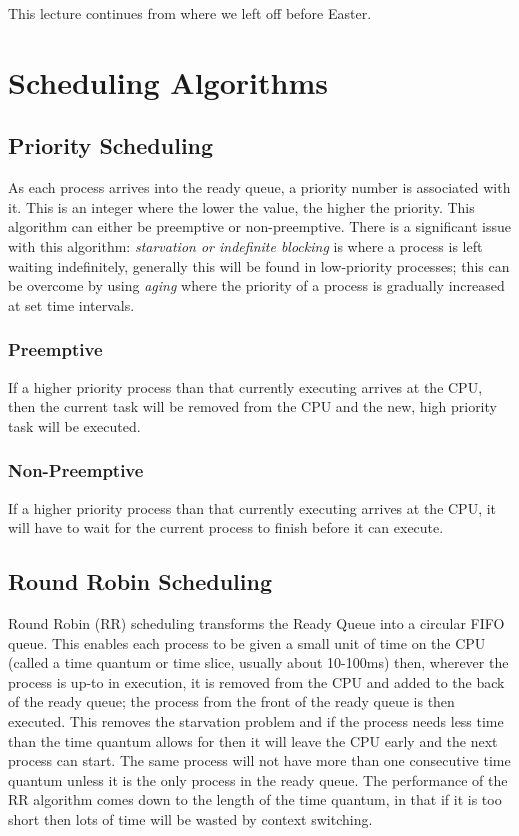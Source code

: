 
This lecture continues from where we left off before Easter.

\section*{Scheduling Algorithms}

\subsection*{Priority Scheduling}
As each process arrives into the ready queue, a priority number is associated with it. This is an integer where the lower the value, the higher the priority. This algorithm can either be preemptive or non-preemptive. There is a significant issue with this algorithm: \textit{starvation or indefinite blocking} is where a process is left waiting indefinitely, generally this will be found in low-priority processes; this can be overcome by using \textit{aging} where the priority of a process is gradually increased at set time intervals. 
\subsubsection*{Preemptive}
If a higher priority process than that currently executing arrives at the CPU, then the current task will be removed from the CPU and the new, high priority task will be executed.
\subsubsection*{Non-Preemptive}
If a higher priority process than that currently executing arrives at the CPU, it will have to wait for the current process to finish before it can execute.

\subsection*{Round Robin Scheduling}
Round Robin (RR) scheduling transforms the Ready Queue into a circular FIFO queue. This enables each process to be given a small unit of time on the CPU (called a time quantum or time slice, usually about 10-100ms) then, wherever the process is up-to in execution, it is removed from the CPU and added to the back of the ready queue; the process from the front of the ready queue is then executed. This removes the starvation problem and if the process needs less time than the time quantum allows for then it will leave the CPU early and the next process can start. The same process will not have more than one consecutive time quantum unless it is the only process in the ready queue. The performance of the RR algorithm comes down to the length of the time quantum, in that if it is too short then lots of time will be wasted by context switching. 


